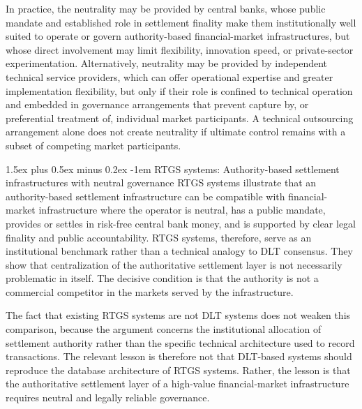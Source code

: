 \documentclass[
reprint,
showkeys,
superscriptaddress,
aps,
pra,
longbibliography,
nofootinbib,
]{revtex4-2}
\makeatletter
\theoremstyle{definition}\newtheorem{definition}{Definition}
\renewcommand\paragraph{%
	\@startsection{paragraph}{4}{\z@}%
	{1.5ex plus 0.5ex minus 0.2ex}%
	{-1em}%
	{\normalfont\normalsize\bfseries}%
}
\makeatother
\begin{document}
In practice, the neutrality may be provided by central banks, whose public mandate and established role in settlement finality make them institutionally well suited to operate or govern authority-based financial-market infrastructures, but whose direct involvement may limit flexibility, innovation speed, or private-sector experimentation.
Alternatively, neutrality may be provided by independent technical service providers, which can offer operational expertise and greater implementation flexibility, but only if their role is confined to technical operation and embedded in governance arrangements that prevent capture by, or preferential treatment of, individual market participants.
A technical outsourcing arrangement alone does not create neutrality if ultimate control remains with a subset of competing market participants.

 

\paragraph{RTGS systems: Authority-based settlement infrastructures with neutral governance}
RTGS systems illustrate that an authority-based settlement infrastructure can be compatible with financial-market infrastructure where the operator is neutral, has a public mandate, provides or settles in risk-free central bank money, and is supported by clear legal finality and public accountability. 
RTGS systems, therefore, serve as an institutional benchmark rather than a technical analogy to DLT consensus.
They show that centralization of the authoritative settlement layer is not necessarily problematic in itself. 
The decisive condition is that the authority is not a commercial competitor in the markets served by the infrastructure.

The fact that existing RTGS systems are not DLT systems does not weaken this comparison, because the argument concerns the institutional allocation of settlement authority rather than the specific technical architecture used to record transactions.
The relevant lesson is therefore not that DLT-based systems should reproduce the database architecture of RTGS systems. Rather, the lesson is that the authoritative settlement layer of a high-value financial-market infrastructure requires neutral and legally reliable governance.
\end{document}
